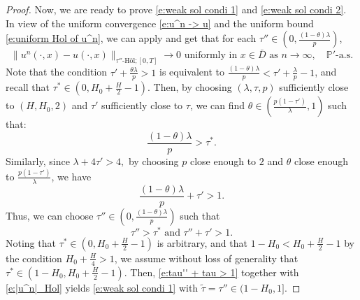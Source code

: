 \documentclass[11pt,reqno]{amsart}
\numberwithin{equation}{section}
\begin{document}
\begin{proof}
Now, we are ready  to prove \eqref{e:weak sol condi 1} and \eqref{e:weak sol condi 2}. In view of the  uniform convergence  \eqref{e:u^n -> u} and the uniform bound  \eqref{e:uniform Hol of u^n}, we can apply  \cite[Corollary 8.18 (ii)]{FrizVictoir} and get that for each $\tau''\in (0,\frac{(1-\theta)\lambda}{p})$,	 
\begin{equation}\label{e:|u^n|_Hol}
\|u^n(\cdot,x) - u(\cdot,x)\|_{\tau''\text{-H\"ol};[0,T]}\to 0 \text{ uniformly in } x\in \bar{D}\text{ as } n\to \infty, \quad  \mathbb{P}'\text{-a.s.} 
\end{equation}
Note that the condition  $\tau' + \frac{\theta\lambda}{p} > 1$ is equivalent to $\frac{(1-\theta)\lambda}{p}< \tau' + \frac{\lambda}{p}  - 1$, and  recall that $\tau^*\in (0,H_0+\frac{H}{2} - 1)$. Then, by choosing $(\lambda, \tau, p)$ sufficiently close to $(H, H_0, 2)$ and  $\tau'$ sufficiently close to   $\tau$, we can find  $\theta\in (\frac{p(1-\tau')}{\lambda},1)$ such that:
\begin{equation*}
\frac{(1-\theta)\lambda}{p}> \tau^*.
\end{equation*}
Similarly, since $\lambda + 4\tau'> 4,$ by choosing $p$ close enough to $2$ and $\theta$ close enough to $\frac{p(1-\tau')}{\lambda}$, we have 
\[\frac{(1-\theta)\lambda}{p} + \tau' > 1.\]
Thus, we can choose $\tau''\in (0,\frac{(1-\theta)\lambda}{p})$ such that
\begin{equation}\label{e:tau'' + tau > 1}
\tau'' > \tau^*\text{ and }\tau'' + \tau' > 1.
\end{equation}
Noting that 
$\tau^{*}\in (0,H_0 + \frac{H}{2} - 1)$ is arbitrary, and that $1 - H_0 < H_0 + \frac{H}{2} - 1$ by the condition $H_{0} + \frac{H}{4} > 1$, we assume without loss of generality that $\tau^* \in (1 - H_{0}, H_0 + \frac{H}{2} - 1)$. Then, \eqref{e:tau'' + tau > 1} together with \eqref{e:|u^n|_Hol} yields \eqref{e:weak sol condi 1} with $\tilde{\tau} = \tau''\in(1-H_0,1]$.


\end{proof}
\end{document}
